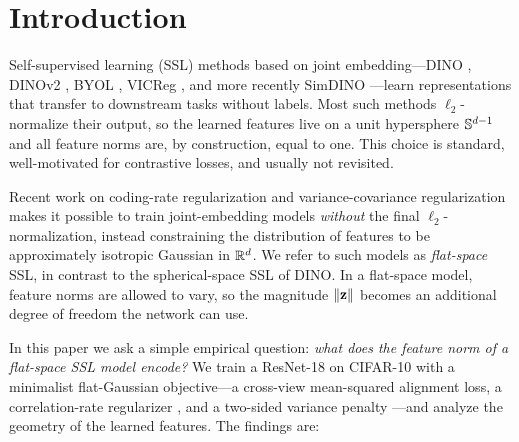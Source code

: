 \section{Introduction}
\label{sec:introduction}

Self-supervised learning (SSL) methods based on joint embedding---DINO \citep{caron2021emerging}, DINOv2 \citep{oquab2023dinov2}, BYOL \citep{grill2020byol}, VICReg \citep{bardes2022vicreg}, and more recently SimDINO \citep{wu2025simdino}---learn representations that transfer to downstream tasks without labels. Most such methods $\ell_2$-normalize their output, so the learned features live on a unit hypersphere $\mathbb{S}^{d-1}$ and all feature norms are, by construction, equal to one. This choice is standard, well-motivated for contrastive losses, and usually not revisited.

Recent work on coding-rate regularization \citep{yu2020mcr2, wu2025simdino} and variance-covariance regularization \citep{bardes2022vicreg, zbontar2021barlow} makes it possible to train joint-embedding models \emph{without} the final $\ell_2$-normalization, instead constraining the distribution of features to be approximately isotropic Gaussian in $\mathbb{R}^d$. We refer to such models as \emph{flat-space} SSL, in contrast to the spherical-space SSL of DINO. In a flat-space model, feature norms are allowed to vary, so the magnitude $\|\mathbf{z}\|$ becomes an additional degree of freedom the network can use.

In this paper we ask a simple empirical question: \emph{what does the feature norm of a flat-space SSL model encode?} We train a ResNet-18 \citep{he2016resnet} on CIFAR-10 \citep{krizhevsky2009cifar} with a minimalist flat-Gaussian objective---a cross-view mean-squared alignment loss, a correlation-rate regularizer \citep{ma2007segmentation, wu2025simdino}, and a two-sided variance penalty \citep{schaeffer2024sigreg}---and analyze the geometry of the learned features. The findings are:

